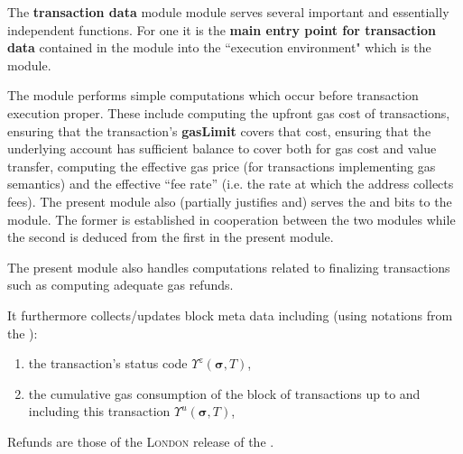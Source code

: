 The \textbf{transaction data} module \txnDataMod{} module serves several important and essentially independent functions.
For one it is the \textbf{main entry point for transaction data} contained in the \rlpTxnMod{} module into the ``execution environment" which is the \hubMod{} module.

The \txnDataMod{} module performs simple computations which occur before transaction execution proper.
These include computing the upfront gas cost of transactions,
ensuring that the transaction's \textbf{gasLimit} covers that cost,
ensuring that the underlying account has sufficient balance to cover both for gas cost and value transfer,
computing the effective gas price (for transactions implementing \cite{EIP-1559} gas semantics)
and the effective ``fee rate'' (i.e. the rate at which the  address collects fees).
The present module also (partially justifies and) serves the \txRequiresEvmExecution{} and \txCopyTxcd{} bits to the \hubMod{} module. 
The former is established in cooperation between the two modules while the second is deduced from the first in the present module.


The present module also handles computations related to finalizing transactions
such as computing adequate gas refunds.

It furthermore collects/updates block meta data
including (using notations from the \cite{EYP-London}):
\begin{enumerate}
        \item the transaction's status code $\Upsilon^z(\bm{\sigma}, T)$,
        \item the cumulative gas consumption of the block of transactions up to and including this transaction $\Upsilon^u(\bm{\sigma}, T)$,
\end{enumerate}

\saNote{}
Refunds are those of the \textsc{London} release of the \evm{}.
